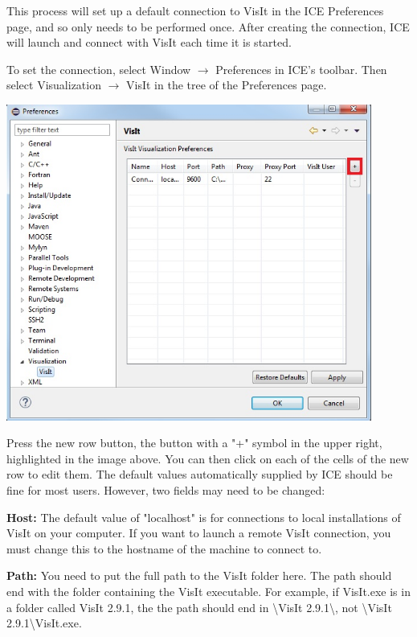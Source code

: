\documentclass{article}
\begin{document}
This process will set up a default connection to VisIt in the ICE Preferences
page, and so only needs to be performed once. After creating the connection, ICE
will launch and connect with VisIt each time it is started.

To set the connection, select Window $\rightarrow$ Preferences in ICE's toolbar. Then
select Visualization $\rightarrow$ VisIt in the tree of the Preferences page. 

\begin{center}
\includegraphics[width=12cm]{images/VisItPreferencePage_ICE}
\end{center}

Press the new row button, the button with a "+" symbol in the upper right,
highlighted in the image above. You can then click on each of the cells of the
new row to edit them. The default values automatically supplied by ICE should
be fine for most users. However, two fields may need to be changed:

\textbf{Host:} The default value of "localhost" is for connections to local
installations of VisIt on your computer. If you want to launch a remote VisIt
connection, you must change this to the hostname of the machine to connect to.

\textbf{Path:} You need to put the full path to the VisIt folder here. The path
should end with the folder containing the VisIt executable. For example, if
VisIt.exe is in a folder called VisIt 2.9.1, the the path should end in
\textbackslash{}VisIt 2.9.1\textbackslash , not \textbackslash{}VisIt
2.9.1\textbackslash VisIt.exe.
\end{document}
